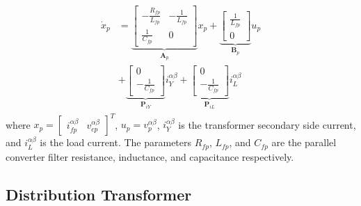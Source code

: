 \begin{align}
    \begin{aligned}
        \dot{x}_p &=
        \underbrace{
        \begin{bmatrix}
            -\frac{R_{fp}}{L_{fp}} & -\frac{1}{L_{fp}}\\
            \frac{1}{C_{fp}} & 0
        \end{bmatrix}
        }_{\mathbf{A}_p}
        x_p +
        \underbrace{
        \begin{bmatrix}
            \frac{1}{L_{fp}}\\
            0
        \end{bmatrix}
        }_{\mathbf{B}_p}
        u_p\\
        &+
        \underbrace{
        \begin{bmatrix}
            0\\
            -\frac{1}{C_{fp}}
        \end{bmatrix}
        }_{\mathbf{P}_{iY}}
        i_Y^{\alpha\beta}
        +
        \underbrace{
        \begin{bmatrix}
            0\\
            -\frac{1}{C_{fp}}
        \end{bmatrix}
        }_{\mathbf{P}_{iL}}
        i_L^{\alpha\beta} \label{eq:ParallelConverter_Dynamics}
    \end{aligned}
\end{align}
where $x_p = \begin{bmatrix} i_{fp}^{\alpha\beta} & v_{cp}^{\alpha\beta} \end{bmatrix}^T$, $u_p = v_p^{\alpha\beta}$, $i_Y^{\alpha\beta}$ is the transformer secondary side current, and $i_L^{\alpha\beta}$ is the load current. The parameters $R_{fp}$, $L_{fp}$, and $C_{fp}$ are the parallel converter filter resistance, inductance, and capacitance respectively.

\subsection{Distribution Transformer}

